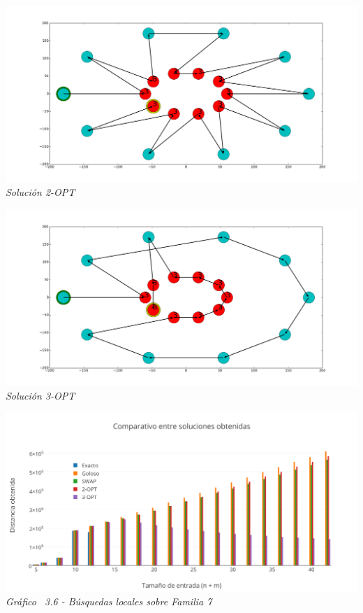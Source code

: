 \vspace*{0.3cm} \vspace*{0.3cm}
  \begin{center}
 \includegraphics[scale=0.3]{./EJ3/anillos2opt.png}\\
 {            \textit{Soluci\'on 2-OPT}}
  \end{center}
  \vspace*{0.3cm}


\vspace*{0.3cm} \vspace*{0.3cm}
  \begin{center}
 \includegraphics[scale=0.3]{./EJ3/anillos3opt.png}\\
 {            \textit{Soluci\'on 3-OPT}}
  \end{center}
  \vspace*{0.3cm}


  \vspace*{0.3cm} \vspace*{0.3cm}
  \begin{center}
 \includegraphics[scale=0.5]{./EJ3/comparacionbusquedaslocalessolucionanillos.png}\\
 {            \textit{Gráfico \ 3.6 - Búsquedas locales sobre Familia 7}}
  \end{center}
  \vspace*{0.3cm}

